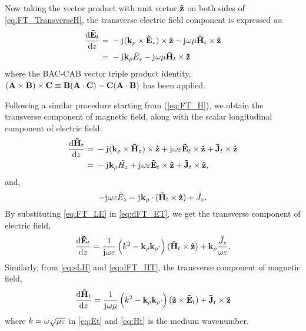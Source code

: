 \documentclass[12pt]{article}
\begin{document}
%
Now taking the vector product with unit vector $\mathbf{\hat{z}}$ on both sides of \eqref{eq:FT_TransverseH}, the transverse electric field component is expressed as:
%
\begin{equation}
  \begin{split}
    \dv{\v{\ti{E}}_t}{z} ={}& -\j (\v{k}_{\p} \x \v{\ti{E}}_z) \x \v{\^{z}}
    -\j \O \u \v{\ti{H}}_t \x \v{\^{z}}\\
    ={}& -\j \v{k}_{\p} \ti{{E}}_z -\j \O \u \v{\ti{H}}_t \x \v{\^{z}}
  \end{split}
  \label{eq:dFT_ET}%
\end{equation}
%
where the BAC-CAB vector triple product identity, $(\mathbf{A} \times \mathbf{B})\times\mathbf{C} \equiv \mathbf{B}(\mathbf{A} \cdot \mathbf{C}) - \mathbf{C}(\mathbf{A} \cdot \mathbf{B})$ has been applied.

Following a similar procedure starting from (\ref{eq:FT_H}), we obtain the transverse component of magnetic field, along with the scalar longitudinal component of electric field:
%
\begin{equation}
  \begin{split}
    \dv{\v{\ti{H}}_t}{z} ={}& -\j (\v{k}_{\p} \x \v{\ti{H}}_z) \x \v{\^{z}}
    + \j \O \E \v{\ti{E}}_t \x \v{\^{z}} +
    \v{\ti{J}}_t \x \v{\^{z}} \\
    ={}& -\j \v{k}_{\p} \ti{{H}_z} + \j \O \E \v{\ti{E}}_t \x \v{\^{z}}  +
    \v{\ti{J}}_t \x \v{\^{z}},
  \end{split}
  \label{eq:dFT_HT}%
\end{equation}
%
and,
\begin{equation}
  -\mathrm{j}\mkern1mu \omega \varepsilon \tilde{E}_z =
  \mathrm{j}\mkern1mu \mathbf{k}_{\rho} \cdot (\mathbf{\tilde{H}}_t \times \mathbf{\hat{z}}) + \tilde{J}_z.
  \label{eq:FT_LE}
\end{equation}
%
By substituting \eqref{eq:FT_LE} in \eqref{eq:dFT_ET}, we get the transverse component of electric field,
%
\begin{equation}
  \dv{\mathbf{\tilde{E}}_t}{z} =
  \frac{1}{\mathrm{j}\mkern1mu \omega \varepsilon} \left( k^2 - \mathbf{k}_{\rho}\mathbf{k}_{\rho} \cdot \right) (\mathbf{\tilde{H}}_t \times \mathbf{\hat{z}}) + \mathbf{k}_{\rho} \frac{\tilde{J}_z}{\omega \varepsilon}.
  \label{eq:Et}
\end{equation}
%
Similarly, from \eqref{eq:sLH} and \eqref{eq:dFT_HT}, the transverse component of magnetic field,
%
\begin{equation}
  \dv{\mathbf{\tilde{H}}_t}{z} =
  \frac{1}{\mathrm{j}\mkern1mu \omega \mu} \left( k^2 - \mathbf{k}_{\rho}\mathbf{k}_{\rho} \cdot \right) (\mathbf{\hat{z}} \times \mathbf{\tilde{E}}_t) + \mathbf{\tilde{J}}_t
  \times \mathbf{\hat{z}}
  \label{eq:Ht}
\end{equation}
%
where $k = \omega \sqrt{\mu \varepsilon}$ in \eqref{eq:Et} and \eqref{eq:Ht} is the medium wavenumber.
\end{document}
